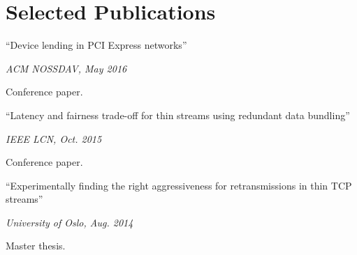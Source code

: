 \section{Selected Publications}
\parbox[t][][t]{\linewidth}{
	\parbox{\linewidth}{{``Device lending in PCI Express networks''}}
	\smallbreak
	\parbox{\linewidth}{\emph{ACM NOSSDAV, May 2016}}
	\smallbreak
	Conference paper.
	\bigbreak
}

\parbox[t][][t]{\linewidth}{
	\parbox{\linewidth}{{``Latency and fairness trade-off for thin
	streams using redundant data bundling''}}
	\smallbreak
	\parbox{\linewidth}{\emph{IEEE LCN, Oct. 2015}}
	\smallbreak
	Conference paper.
	\bigbreak
}

\parbox[t][][t]{\linewidth}{
	\parbox{\linewidth}{{``Experimentally finding the right aggressiveness
	for retransmissions in thin TCP streams''}}
	\smallbreak
	\parbox{\linewidth}{\emph{University of Oslo, Aug. 2014}}
	\smallbreak
	Master thesis.
	\bigbreak
}
